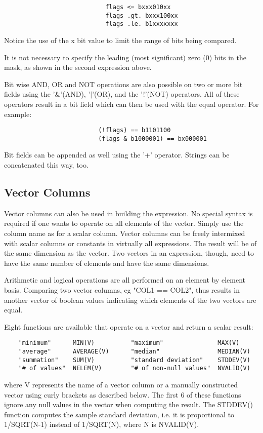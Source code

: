 \documentclass[11pt]{book}
\begin{document}
\begin{verbatim}
                            flags <= bxxx010xx
                            flags .gt. bxxx100xx
                            flags .le. b1xxxxxxx
\end{verbatim}

    Notice the use of the x bit value to limit the range of  bits  being
    compared.

    It  is  not necessary to specify the leading (most significant) zero
    (0) bits in the mask, as shown in the second expression above.

    Bit wise AND, OR and NOT operations are  also  possible  on  two  or
    more  bit  fields  using  the  '\&'(AND),  '$|$'(OR),  and the '!'(NOT)
    operators. All of these operators result in a bit  field  which  can
    then be used with the equal operator. For example:


\begin{verbatim}
                          (!flags) == b1101100
                          (flags & b1000001) == bx000001
\end{verbatim}

    Bit  fields can be appended as well using the '+' operator.  Strings
    can be concatenated this way, too.


\subsection{Vector Columns}

    Vector columns can also be used  in  building  the  expression.   No
    special  syntax  is required if one wants to operate on all elements
    of the vector.  Simply use the column name as for a  scalar  column.
    Vector  columns  can  be  freely  intermixed  with scalar columns or
    constants in virtually all expressions.  The result will be  of  the
    same dimension as the vector.  Two vectors in an expression, though,
    need to  have  the  same  number  of  elements  and  have  the  same
    dimensions.

    Arithmetic and logical operations are all performed on an element by
    element basis.  Comparing two vector columns,  eg  "COL1  ==  COL2",
    thus  results  in  another vector of boolean values indicating which
    elements of the two vectors are equal.

    Eight functions are available that operate on a vector and return a
    scalar result:

\begin{verbatim}
    "minimum"      MIN(V)          "maximum"               MAX(V)
    "average"      AVERAGE(V)      "median"                MEDIAN(V)
    "summation"    SUM(V)          "standard deviation"    STDDEV(V)
    "# of values"  NELEM(V)        "# of non-null values"  NVALID(V)
\end{verbatim}
    where V represents the name of a vector column or a manually
    constructed vector using curly brackets as described below.  The
    first 6 of these functions ignore any null values in the vector when
    computing the result.  The STDDEV() function computes the sample
    standard deviation, i.e. it is proportional to 1/SQRT(N-1) instead
    of 1/SQRT(N), where N is NVALID(V).
\end{document}
